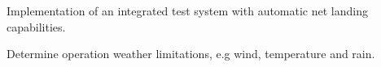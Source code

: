 Implementation of an integrated test system with automatic net landing capabilities.

Determine operation weather limitations, e.g wind, temperature and rain.

%
%
% 
%

\cleardoublepage